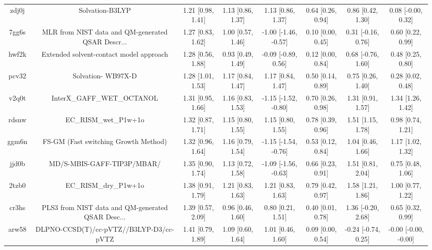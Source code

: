 \documentclass{article}
\begin{document}
\begin{center}
\begin{longtable}{|cccccccc|}
 zdj0j &                                    Solvation-B3LYP &  1.21 [0.98, 1.41] &  1.13 [0.86, 1.37] &     1.13 [0.86, 1.37] &  0.64 [0.26, 0.94] &    0.86 [0.42, 1.30] &    0.08 [-0.00, 0.32] \\
 7gg6s &  MLR from NIST data and QM-generated QSAR Descr... &  1.27 [0.83, 1.62] &  1.00 [0.57, 1.46] &  -1.00 [-1.46, -0.57] &  0.10 [0.00, 0.45] &   0.31 [-0.16, 0.76] &     0.60 [0.22, 0.99] \\
 hwf2k &            Extended solvent-contact model approach &  1.28 [0.56, 1.88] &  0.93 [0.49, 1.49] &   -0.09 [-0.89, 0.56] &  0.12 [0.00, 0.84] &   0.68 [-0.76, 1.60] &     0.48 [0.25, 0.80] \\
 pcv32 &                                 Solvation- WB97X-D &  1.28 [1.01, 1.53] &  1.17 [0.84, 1.47] &     1.17 [0.84, 1.47] &  0.50 [0.14, 0.89] &    0.75 [0.26, 1.40] &     0.28 [0.02, 0.48] \\
 v2q0t &                         InterX\_GAFF\_WET\_OCTANOL &  1.31 [0.95, 1.66] &  1.16 [0.83, 1.53] &  -1.15 [-1.52, -0.80] &  0.70 [0.26, 0.98] &    1.31 [0.91, 1.57] &     1.34 [1.26, 1.42] \\
 rdsnw &                              EC\_RISM\_wet\_P1w+1o &  1.32 [0.87, 1.71] &  1.15 [0.80, 1.55] &     1.15 [0.80, 1.55] &  0.78 [0.39, 0.96] &    1.51 [1.15, 1.78] &     0.98 [0.74, 1.21] \\
 ggm6n &               FS-GM (Fast switching Growth Method) &  1.32 [0.96, 1.64] &  1.16 [0.79, 1.54] &  -1.15 [-1.54, -0.76] &  0.53 [0.12, 0.84] &    1.04 [0.46, 1.66] &     1.17 [1.02, 1.32] \\
 jjd0b &                         MD/S-MBIS-GAFF-TIP3P/MBAR/ &  1.35 [0.90, 1.74] &  1.13 [0.72, 1.58] &  -1.09 [-1.56, -0.63] &  0.66 [0.23, 0.91] &    1.51 [0.81, 2.04] &     0.75 [0.48, 1.06] \\
 2tzb0 &                              EC\_RISM\_dry\_P1w+1o &  1.38 [0.91, 1.79] &  1.21 [0.83, 1.63] &     1.21 [0.83, 1.63] &  0.79 [0.42, 0.97] &    1.58 [1.21, 1.86] &     1.00 [0.77, 1.22] \\
 cr3hs &  PLS3 from NIST data and QM-generated QSAR Desc... &  1.39 [0.57, 2.09] &  0.96 [0.46, 1.60] &     0.80 [0.21, 1.51] &  0.40 [0.01, 0.78] &   1.36 [-0.20, 2.68] &     0.65 [0.32, 0.99] \\
 arw58 &            DLPNO-CCSD(T)/cc-pVTZ//B3LYP-D3/cc-pVTZ &  1.41 [0.79, 1.89] &  1.09 [0.60, 1.64] &     1.01 [0.46, 1.60] &  0.09 [0.00, 0.54] &  -0.24 [-0.74, 0.25] &  -0.00 [-0.00, -0.00] \\

\end{longtable}
\end{center}
\end{document}
